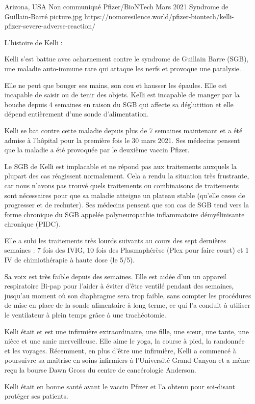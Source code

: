 {Arizona, USA}
{Non communiqué}
{Pfizer/BioNTech}
{Mars 2021}
{Syndrome de Guillain-Barré}
{picture.jpg}
{https://nomoresilence.world/pfizer-biontech/kelli-pfizer-severe-adverse-reaction/}
{

L'histoire de Kelli :

Kelli s'est battue avec acharnement contre le syndrome de Guillain Barre (SGB),
une maladie auto-immune rare qui attaque les nerfs et provoque une paralysie.

Elle ne peut que bouger ses mains, son cou et hausser les épaules. Elle est
incapable de saisir ou de tenir des objets. Kelli est incapable de manger par la
bouche depuis 4 semaines en raison du SGB qui affecte sa déglutition et elle
dépend entièrement d'une sonde d'alimentation.

Kelli se bat contre cette maladie depuis plus de 7 semaines maintenant et a été
admise à l'hôpital pour la première fois le 30 mars 2021. Ses médecins pensent
que la maladie a été provoquée par le deuxième vaccin Pfizer.

Le SGB de Kelli est implacable et ne répond pas aux traitements auxquels la
plupart des cas réagissent normalement. Cela a rendu la situation très
frustrante, car nous n'avons pas trouvé quels traitements ou combinaisons de
traitements sont nécessaires pour que sa maladie atteigne un plateau stable
(qu'elle cesse de progresser et de rechuter). Ses médecins pensent que son cas
de SGB tend vers la forme chronique du SGB appelée polyneuropathie inflammatoire
démyélinisante chronique (PIDC).

Elle a subi les traitements très lourds suivants au cours des sept dernières
semaines : 7 fois des IVIG, 10 fois des Plasmaphérèse (Plex pour faire court) et
1 IV de chimiothérapie à haute dose (le 5/5).

Sa voix est très faible depuis des semaines. Elle est aidée d'un un appareil
respiratoire Bi-pap pour l'aider à éviter d'être ventilé pendant des semaines,
jusqu'au moment où son diaphragme sera trop faible, sans compter les procédures
de mise en place de la sonde alimentaire à long terme, ce qui l'a conduit à
utiliser le ventilateur à plein temps grâce à une trachéotomie.

Kelli était et est une infirmière extraordinaire, une fille, une sœur, une
tante, une nièce et une amie merveilleuse. Elle aime le yoga, la course à pied,
la randonnée et les voyages. Récemment, en plus d'être une infirmière, Kelli a
commencé à poursuivre sa maîtrise en soins infirmiers à l'Université Grand
Canyon et a même reçu la bourse Dawn Gross du centre de cancérologie Anderson.

Kelli était en bonne santé avant le vaccin Pfizer et l'a obtenu pour soi-disant
protéger ses patients.

}
